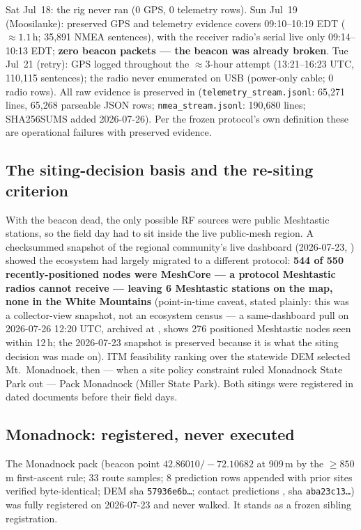 \documentclass[11pt]{article}
\newcommand{\code}[1]{\texttt{\small #1}}
\begin{document}
Sat Jul~18: the rig never ran (0 GPS, 0 telemetry rows). Sun Jul~19
(Moosilauke): preserved GPS and telemetry evidence covers 09:10--10:19 EDT (${\approx}1.1$\,h; 35{,}891 NMEA sentences), with the receiver radio's serial live only 09:14--10:13 EDT; \textbf{zero beacon packets --- the beacon
was already broken}. Tue Jul~21 (retry): GPS logged throughout the ${\approx}3$-hour attempt (13:21--16:23 UTC, 110{,}115 sentences); the radio never enumerated on USB (power-only cable; 0 radio rows). All raw evidence is
preserved in  (\code{telemetry\_stream.jsonl}: 65{,}271 lines, 65{,}268 parseable JSON rows; \code{nmea\_stream.jsonl}: 190{,}680 lines; SHA256SUMS added 2026-07-26). Per the frozen
protocol's own definition these are operational failures with preserved evidence.

\subsection{The siting-decision basis and the re-siting criterion}

With the beacon dead, the only possible RF sources were public Meshtastic
stations, so the field day had to sit inside the live public-mesh region. A
checksummed snapshot of the regional community's live dashboard (2026-07-23,
) showed the ecosystem
had largely migrated to a different protocol: \textbf{544 of 550
recently-positioned nodes were MeshCore --- a protocol Meshtastic radios
cannot receive --- leaving 6 Meshtastic stations on the map, none in the
White Mountains} (point-in-time caveat, stated plainly: this was a collector-view snapshot, not an ecosystem census --- a same-dashboard pull on 2026-07-26 12:20 UTC, archived at , shows 276 positioned Meshtastic nodes seen within 12\,h; the 2026-07-23 snapshot is preserved because it is what the siting decision was made on). ITM feasibility ranking over the statewide DEM
selected Mt.~Monadnock, then --- when a site policy constraint ruled
Monadnock State Park out --- Pack Monadnock (Miller State Park). Both
sitings were registered in dated documents before their field days.

\subsection{Monadnock: registered, never executed}

The Monadnock pack (beacon point $42.86010/-72.10682$ at 909\,m by the
${\geq}850$\,m first-ascent rule; 33 route samples; 8 prediction rows
appended with prior sites verified byte-identical; DEM sha
\code{57936e6b\ldots}; contact predictions
, sha
\code{aba23c13\ldots}) was fully registered on 2026-07-23 and never walked.
It stands as a frozen sibling registration.
\end{document}
